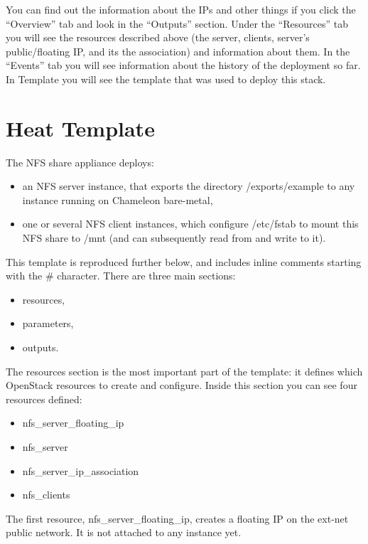 You can find out the information about the IPs and other things if you
click the ``Overview'' tab and look in the ``Outputs'' section. Under
the ``Resources'' tab you will see the resources described above (the
server, clients, server's public/floating IP, and its the association)
and information about them. In the ``Events'' tab you will see
information about the history of the deployment so far. In Template you
will see the template that was used to deploy this stack.

\section{Heat Template}

The NFS share appliance deploys:

\begin{itemize}
\item
  an NFS server instance, that exports the directory /exports/example to
  any instance running on Chameleon bare-metal,
\item
  one or several NFS client instances, which configure /etc/fstab to
  mount this NFS share to /mnt (and can subsequently read from and write
  to it).
\end{itemize}

This template is reproduced further below, and includes inline comments
starting with the \# character. There are three main sections:

\begin{itemize}
\item
  resources,
\item
  parameters,
\item
  outputs.
\end{itemize}

The resources section is the most important part of the template: it
defines which OpenStack resources to create and configure. Inside this
section you can see four resources defined:

\begin{itemize}
\item
  nfs\_server\_floating\_ip
\item
  nfs\_server~
\item
  nfs\_server\_ip\_association
\item
  nfs\_clients
\end{itemize}

The first resource, nfs\_server\_floating\_ip, creates a floating IP on
the ext-net public network. It is not attached to any instance yet.

